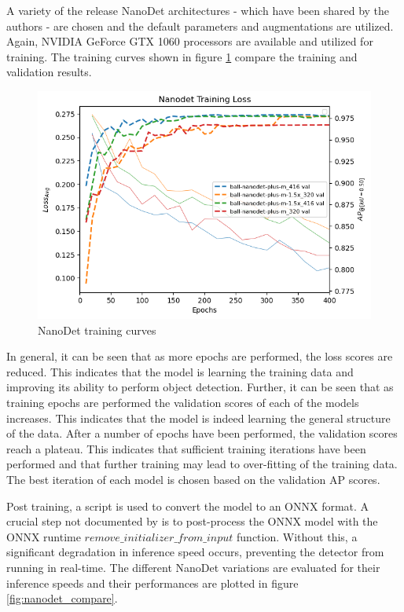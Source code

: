 \documentclass[a4paper,twoside,12pt]{report}
\begin{document}
A variety of the release NanoDet architectures - which have been shared by the authors - are chosen and the default parameters and augmentations are utilized. Again, NVIDIA GeForce GTX 1060 processors are available and utilized for training. The training curves shown in figure \ref{fig:nanodet_train} compare the training and validation results.

\begin{figure}[h!]
\begin{center}
\includegraphics[width=13cm]{images/nanodet_train.png}
\caption{NanoDet training curves}
\label{fig:nanodet_train}
\end{center}
\end{figure}

In general, it can be seen that as more epochs are performed, the loss scores are reduced. This indicates that the model is learning the training data and improving its ability to perform object detection. Further, it can be seen that as training epochs are performed the validation scores of each of the models increases. This indicates that the model is indeed learning the general structure of the data. After a number of epochs have been performed, the validation scores reach a plateau. This indicates that sufficient training iterations have been performed and that further training may lead to over-fitting of the training data. The best iteration of each model is chosen based on the validation AP scores. 

Post training, a script is used to convert the model to an ONNX format. A crucial step not documented by \cite{nanodet} is to post-process the ONNX model with the ONNX runtime $remove\_initializer\_from\_input$ function. Without this, a significant degradation in inference speed occurs, preventing the detector from running in real-time. The different NanoDet variations are evaluated for their inference speeds and their performances are plotted in figure \ref{fig:nanodet_compare}.
\end{document}
